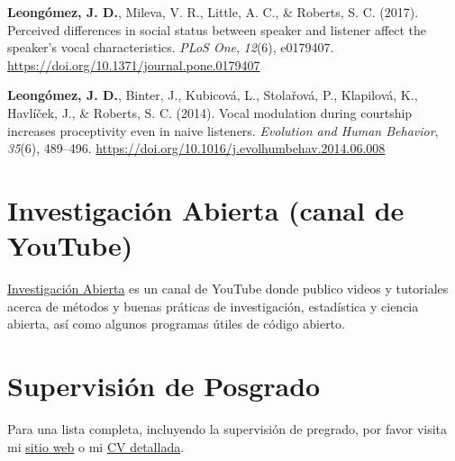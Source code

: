 \documentclass[11pt,a4paper,]{awesome-cv}
\begin{document}
\leavevmode{}%
\textbf{Leongómez, J. D.}, Mileva, V. R., Little, A. C., \& Roberts, S.
C. (2017). {Perceived differences in social status between speaker and
listener affect the speaker's vocal characteristics}. \emph{PLoS One},
\emph{12}(6), e0179407.
\url{https://doi.org/10.1371/journal.pone.0179407}

\leavevmode{}%
\textbf{Leongómez, J. D.}, Binter, J., Kubicová, L., Stolařová, P.,
Klapilová, K., Havlíček, J., \& Roberts, S. C. (2014). {Vocal modulation
during courtship increases proceptivity even in naive listeners}.
\emph{Evolution and Human Behavior}, \emph{35}(6), 489--496.
\url{https://doi.org/10.1016/j.evolhumbehav.2014.06.008}

\endgroup

\hypertarget{investigaciuxf3n-abierta-canal-de-youtube}{%
\section{Investigación Abierta (canal de
YouTube)}\label{investigaciuxf3n-abierta-canal-de-youtube}}

\href{https://www.youtube.com/c/InvestigaciónAbierta}{\textcolor{red}{\faYoutubePlay}
Investigación Abierta} es un canal de YouTube donde publico videos y
tutoriales acerca de métodos y buenas práticas de investigación,
estadística y ciencia abierta, así como algunos programas útiles de
código abierto.

\hypertarget{supervisiuxf3n-de-posgrado}{%
\section{Supervisión de Posgrado}\label{supervisiuxf3n-de-posgrado}}

Para una lista completa, incluyendo la supervisión de pregrado, por
favor visita mi \href{https://jdleongomez.info/es/team/\#students}{sitio
web} o mi \href{https://jdleongomez.info/es/files/jdl_cv_es.pdf}{CV
detallada}.
\end{document}
